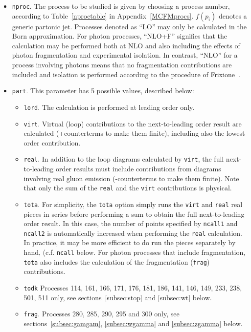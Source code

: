 \documentclass[12pt]{article}
\begin{document}
\begin{itemize}
\item {\tt nproc}.
The process to be studied is given by
choosing a process number, according to Table~\ref{nproctable}
in Appendix~\ref{MCFMprocs}.
$f(p_i)$ denotes a generic partonic jet. Processes denoted as
``LO'' may only be calculated in the Born approximation. For photon
processes, ``NLO+F'' signifies that the calculation may be performed
both at NLO and also including the effects of photon fragmentation
and experimental isolation. In contrast, ``NLO'' for a process involving
photons means that no fragmentation contributions are included and isolation
is performed according to the procedure of Frixione~\cite{Frixione:1998jh}.
\item {\tt part}.
This parameter has 5 possible values, described below:
\begin{itemize}
\item {\tt lord}.
The calculation is performed at leading order only.
\item {\tt virt}.
Virtual (loop) contributions to the next-to-leading order result are
calculated (+counterterms to make them finite), including also the
lowest order contribution.
\item {\tt real}.
In addition to the loop diagrams calculated by {\tt virt}, the full
next-to-leading order results must include contributions from diagrams
involving real gluon emission (-counterterms to make them finite).
Note that only the sum of the {\tt real} and the {\tt virt} contributions
is physical.
\item {\tt tota}.
For simplicity, the {\tt tota} option simply runs the {\tt virt} and
{\tt real} real pieces in series before performing a sum to obtain
the full next-to-leading order result. In this case, the number of
points specified by {\tt ncall1} and {\tt ncall2} is automatically
increased when performing the {\tt real} calculation. In practice,
it may be more efficient to do run the pieces separately by hand, 
(c.f. {\tt ncall} below. For photon processes that include fragmentation,
{\tt tota} also includes the calculation of the fragmentation ({\tt frag})
contributions.
\item {\tt todk}
Processes 114, 161, 166, 171, 176, 181, 186, 141, 146, 149, 233, 238, 501, 511 only, see sections~\ref{subsec:stop} and
\ref{subsec:wt} below.
\item {\tt frag}.
Processes 280, 285, 290, 295 and 300 only, see sections~\ref{subsec:gamgam}, \ref{subsec:wgamma} and
\ref{subsec:zgamma} below.

\end{itemize}


\end{itemize}
\end{document}

